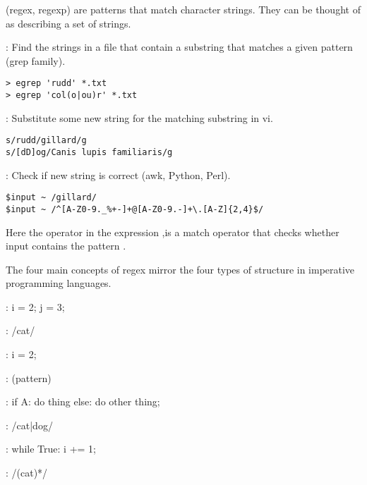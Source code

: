  (regex, regexp) are patterns that match character
strings. They can be thought of as describing a set of strings.
\begin{compactitem}
\item {}: Find the strings in a file that contain a substring that
matches a given pattern (grep family).
\begin{lstlisting}
> egrep 'rudd' *.txt
> egrep 'col(o|ou)r' *.txt
\end{lstlisting}
\item {}: Substitute some new string for the matching
substring in vi.
\begin{lstlisting}
s/rudd/gillard/g
s/[dD]og/Canis lupis familiaris/g
\end{lstlisting}
\item {}: Check if new string is correct (awk, Python, Perl).
\begin{lstlisting}
$input ~ /gillard/
$input ~ /^[A-Z0-9._%+-]+@[A-Z0-9.-]+\.[A-Z]{2,4}$/
\end{lstlisting}
Here the operator \e{$\sim$} in the expression ,is
a match operator that checks whether input contains the pattern
.
\end{compactitem}

The four main concepts of regex mirror the four types of structure in
imperative programming languages.\begin{compactitem}
\item {}: i = 2; j = 3; 
\item {}: /cat/
\item {}: i = 2; 
\item {}: (pattern)
\item {}: if A: do thing else: do other thing; 
\item {}: /cat|dog/
\item {}: while True: i += 1; 
\item {}: /(cat)*/
\end{compactitem}


